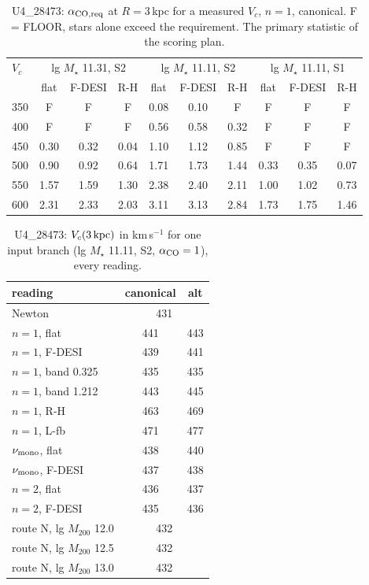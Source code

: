 \begin{table}[h]\centering\small\caption{U4\_28473: $\alpha_{\rm CO,req}$ at $R=3$\,kpc for a measured $V_c$, $n=1$, canonical. F = FLOOR, stars alone exceed the requirement. The primary statistic of the scoring plan.}\label{t:inv}\begin{tabular}{lccccccccc}\toprule
$V_c$ & \multicolumn{3}{c}{lg $M_\star$ 11.31, S2} & \multicolumn{3}{c}{lg $M_\star$ 11.11, S2} & \multicolumn{3}{c}{lg $M_\star$ 11.11, S1} \\ & flat & F-DESI & R-H & flat & F-DESI & R-H & flat & F-DESI & R-H \\ \midrule
350 & F & F & F & 0.08 & 0.10 & F & F & F & F \\
400 & F & F & F & 0.56 & 0.58 & 0.32 & F & F & F \\
450 & 0.30 & 0.32 & 0.04 & 1.10 & 1.12 & 0.85 & F & F & F \\
500 & 0.90 & 0.92 & 0.64 & 1.71 & 1.73 & 1.44 & 0.33 & 0.35 & 0.07 \\
550 & 1.57 & 1.59 & 1.30 & 2.38 & 2.40 & 2.11 & 1.00 & 1.02 & 0.73 \\
600 & 2.31 & 2.33 & 2.03 & 3.11 & 3.13 & 2.84 & 1.73 & 1.75 & 1.46 \\
\bottomrule\end{tabular}\end{table}
\begin{table}[h]\centering\small\caption{U4\_28473: $V_c(3\,{\rm kpc})$ in km\,s$^{-1}$ for one input branch (lg $M_\star$ 11.11, S2, $\alpha_{\rm CO}=1$), every reading.}\label{t:read}\begin{tabular}{lcc}\toprule
reading & canonical & alt \\ \midrule
Newton & \multicolumn{2}{c}{431} \\
$n=1$, flat & 441 & 443 \\
$n=1$, F-DESI & 439 & 441 \\
$n=1$, band 0.325 & 435 & 435 \\
$n=1$, band 1.212 & 443 & 445 \\
$n=1$, R-H & 463 & 469 \\
$n=1$, L-fb & 471 & 477 \\
$\nu_{\rm mono}$, flat & 438 & 440 \\
$\nu_{\rm mono}$, F-DESI & 437 & 438 \\
$n=2$, flat & 436 & 437 \\
$n=2$, F-DESI & 435 & 436 \\
route N, lg $M_{200}$ 12.0 & \multicolumn{2}{c}{432} \\
route N, lg $M_{200}$ 12.5 & \multicolumn{2}{c}{432} \\
route N, lg $M_{200}$ 13.0 & \multicolumn{2}{c}{432} \\
\bottomrule\end{tabular}\end{table}
